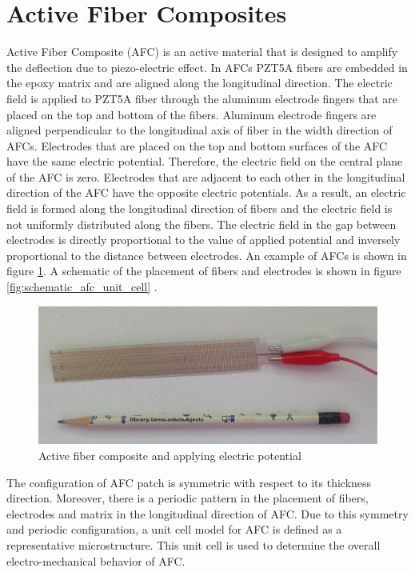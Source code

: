 \section{Active Fiber Composites}
Active Fiber Composite (AFC) is an active material that is designed to amplify the deflection due to piezo-electric effect. In AFCs PZT5A fibers are embedded in the epoxy matrix and are aligned along the longitudinal direction. The electric field is applied to PZT5A fiber through the aluminum electrode fingers that are placed on the top and bottom of the fibers. Aluminum electrode fingers are aligned perpendicular to the longitudinal axis of fiber in the width direction of AFCs. Electrodes that are placed on the top and bottom surfaces of the AFC have the same electric potential. Therefore, the electric field on the central plane of the AFC is zero. Electrodes that are adjacent to each other in the longitudinal direction of the AFC have the opposite electric potentials. As a result, an electric field is formed along the longitudinal direction of fibers and the electric field is not uniformly distributed along the fibers. The electric field in the gap between electrodes is directly proportional to the value of applied potential and inversely proportional to the distance between electrodes. An example of AFCs is shown in figure \ref{fig:afc_picture_from_lap}.
A schematic of the placement of fibers and electrodes is shown in figure \ref{fig:schematic_afc_unit_cell} \cite{jemai2014mathematical}.

\begin{figure} 
\centering
\includegraphics[width=6.0in]{./chap_4_structural_analyses/afc_unit_cell/afc_picture_from_lap.png}
\caption{Active fiber composite and applying electric potential}
\label{fig:afc_picture_from_lap}
\end{figure}
The configuration of AFC patch is symmetric with respect to its thickness direction.
Moreover, there is a periodic pattern in the placement of fibers, electrodes and matrix in the longitudinal direction of AFC.
Due to this symmetry and periodic configuration, a unit cell model for AFC is defined as a representative microstructure.
This unit cell is used to determine the overall electro-mechanical behavior of AFC.  

